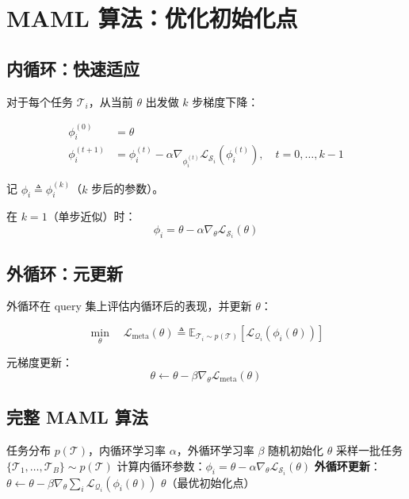 \section{MAML 算法：优化初始化点}
\label{sec:maml}

\subsection*{内循环：快速适应}

对于每个任务 $\mathcal{T}_i$，从当前 $\theta$ 出发做 $k$ 步梯度下降：

\begin{align}
  \phi_i^{(0)} &= \theta \\
  \phi_i^{(t+1)} &= \phi_i^{(t)} - \alpha \nabla_{\phi_i^{(t)}} \mathcal{L}_{\mathcal{S}_i}(\phi_i^{(t)}), \quad t = 0, \ldots, k-1
  \label{eq:maml_inner}
\end{align}

记 $\phi_i \triangleq \phi_i^{(k)}$（$k$ 步后的参数）。

在 $k = 1$（单步近似）时：
\begin{equation}
  \phi_i = \theta - \alpha \nabla_\theta \mathcal{L}_{\mathcal{S}_i}(\theta)
  \label{eq:maml_inner_1step}
\end{equation}

\subsection*{外循环：元更新}

外循环在 query 集上评估内循环后的表现，并更新 $\theta$：

\begin{equation}
  \min_\theta \quad \mathcal{L}_\text{meta}(\theta) \triangleq
  \mathbb{E}_{\mathcal{T}_i \sim p(\mathcal{T})} \left[ \mathcal{L}_{\mathcal{Q}_i}(\phi_i(\theta)) \right]
  \label{eq:maml_outer}
\end{equation}

元梯度更新：
\begin{equation}
  \theta \leftarrow \theta - \beta \nabla_\theta \mathcal{L}_\text{meta}(\theta)
  \label{eq:maml_meta_update}
\end{equation}

\subsection*{完整 MAML 算法}

\begin{algorithm}[H]
\caption{MAML（简化版，$k=1$）}
\begin{algorithmic}[1]
\Require 任务分布 $p(\mathcal{T})$，内循环学习率 $\alpha$，外循环学习率 $\beta$
\State 随机初始化 $\theta$
  \State 采样一批任务 $\{\mathcal{T}_1, \ldots, \mathcal{T}_B\} \sim p(\mathcal{T})$
    \State 计算内循环参数：$\phi_i = \theta - \alpha \nabla_\theta \mathcal{L}_{\mathcal{S}_i}(\theta)$
  \EndFor
  \State \textbf{外循环更新}：$\theta \leftarrow \theta - \beta \nabla_\theta \sum_{i} \mathcal{L}_{\mathcal{Q}_i}(\phi_i(\theta))$
\EndFor
\Return $\theta$（最优初始化点）
\end{algorithmic}
\end{algorithm}


